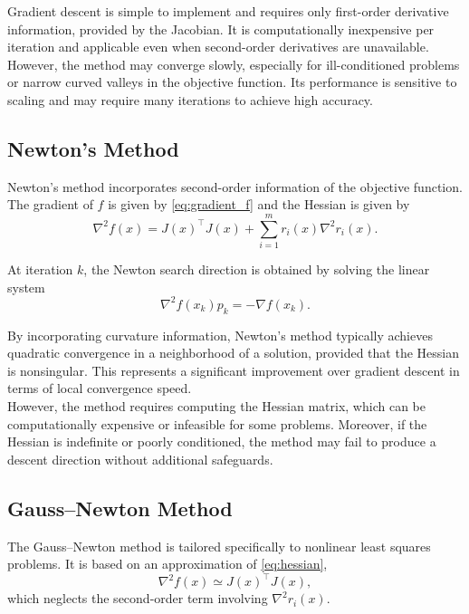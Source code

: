 Gradient descent is simple to implement and requires only first-order derivative information, provided by the Jacobian. It is computationally inexpensive per iteration and applicable even when second-order derivatives are unavailable. However, the method may converge slowly, especially for ill-conditioned problems or narrow curved valleys in the objective function. Its performance is sensitive to scaling and may require many iterations to achieve high accuracy.

\subsection{Newton's Method}

Newton's method \cite{madsen2004} incorporates second-order information of the objective function. 
The gradient of $f$ is given by \cref{eq:gradient_f} and the Hessian is given by
\begin{equation}
\label{eq:hessian}
    \nabla^2 f(x) = J(x)^\top J(x) + \sum_{i=1}^m r_i(x)\nabla^2 r_i(x).
\end{equation}

At iteration $k$, the Newton search direction is obtained by solving the linear system
\begin{equation*}
    \nabla^2 f(x_k) p_k = - \nabla f(x_k).
\end{equation*}

By incorporating curvature information, Newton's method typically achieves quadratic convergence in a neighborhood of a solution, provided that the Hessian is nonsingular. This represents a significant improvement over gradient descent in terms of local convergence speed.\\

However, the method requires computing the Hessian matrix, which can be computationally expensive or infeasible for some problems. Moreover, if the Hessian is indefinite or poorly conditioned, the method may fail to produce a descent direction without additional safeguards.

\subsection{Gauss--Newton Method}

The Gauss--Newton method \cite{madsen2004} is tailored specifically to nonlinear least squares problems. 
It is based on an approximation of \cref{eq:hessian},
\begin{equation*}
    \nabla^2 f(x) \simeq J(x)^\top J(x),
\end{equation*}
which neglects the second-order term involving $\nabla^2 r_i(x)$.\\

